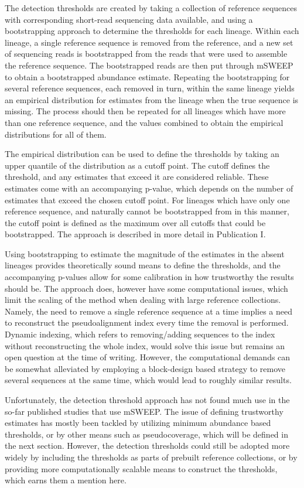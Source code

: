 \documentclass[officiallayout]{tktla}
\begin{document}
The detection thresholds are created by taking a collection of
reference sequences with corresponding short-read sequencing data
available, and using a bootstrapping approach to determine the
thresholds for each lineage. Within each lineage, a single reference
sequence is removed from the reference, and a new set of sequencing
reads is bootstrapped from the reads that were used to assemble the
reference sequence. The bootstrapped reads are then put through mSWEEP
to obtain a bootstrapped abundance estimate. Repeating the
bootstrapping for several reference sequences, each removed in turn,
within the same lineage yields an empirical distribution for estimates
from the lineage when the true sequence is missing. The process should
then be repeated for all lineages which have more than one reference
sequence, and the values combined to obtain the empirical
distributions for all of them.

The empirical distribution can be used to define the thresholds by
taking an upper quantile of the distribution as a cutoff point. The
cutoff defines the threshold, and any estimates that exceed it are
considered reliable. These estimates come with an accompanying
p-value, which depends on the number of estimates that exceed the
chosen cutoff point. For lineages which have only one reference
sequence, and naturally cannot be bootstrapped from in this manner,
the cutoff point is defined as the maximum over all cutoffs that could
be bootstrapped. The approach is described in more detail in Publication I.

Using bootstrapping to estimate the magnitude of the estimates in the
absent lineages provides theoretically sound means to define the
thresholds, and the accompanying p-values allow for some calibration
in how trustworthy the results should be. The approach does, however
have some computational issues, which limit the scaling of the method
when dealing with large reference collections. Namely, the need to
remove a single reference sequence at a time implies a need to
reconstruct the pseudoalignment index every time the removal is
performed. Dynamic indexing, which refers to removing/adding sequences
to the index without reconstructing the whole index, would solve this
issue but remains an open question at the time of writing. However,
the computational demands can be somewhat alleviated by employing a
block-design based strategy to remove several sequences at
the same time, which would lead to roughly similar results.

Unfortunately, the detection threshold approach has not found much use
in the so-far published studies that use mSWEEP. The issue of defining
trustworthy estimates has mostly been tackled by utilizing minimum
abundance based thresholds, or by other means such as pseudocoverage,
which will be defined in the next section. However, the detection
thresholds could still be adopted more widely by including the
thresholds as parts of prebuilt reference collections, or by providing
more computationally scalable means to construct the thresholds, which
earns them a mention here.
\end{document}
